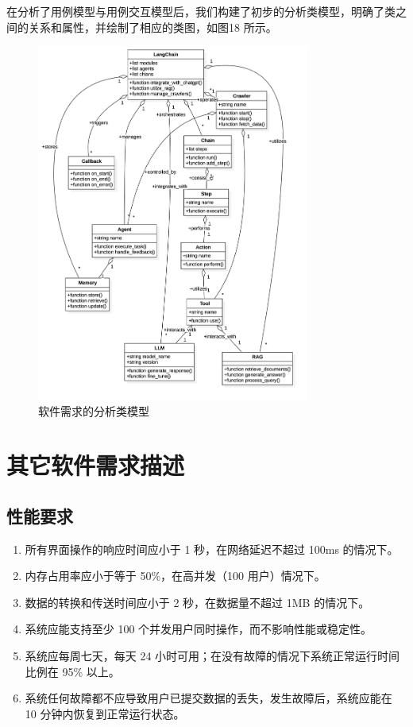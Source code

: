 \documentclass[
    report,     %
    oneside,    %
    UTF8,       %
    zihao=-4    %
]{config} %
\begin{document}
在分析了用例模型与用例交互模型后，我们构建了初步的分析类模型，明确了类之间的关系和属性，并绘制了相应的类图，如图18 所示。
\begin{figure}[H]
    \centering
    \includegraphics[width=0.8\textwidth]{UML/ClassDiagram.png}
    \caption{软件需求的分析类模型}
    \label{fig:analysis-class-model}
\end{figure}

\section{其它软件需求描述}
\subsection{性能要求}
\begin{enumerate}[label=(\arabic*)]
    \item 所有界面操作的响应时间应小于 1 秒，在网络延迟不超过 100ms 的情况下。
    \item 内存占用率应小于等于 50\%，在高并发（100 用户）情况下。
    \item 数据的转换和传送时间应小于 2 秒，在数据量不超过 1MB 的情况下。
    \item 系统应能支持至少 100 个并发用户同时操作，而不影响性能或稳定性。
    \item 系统应每周七天，每天 24 小时可用；在没有故障的情况下系统正常运行时间比例在 95\% 以上。
    \item 系统任何故障都不应导致用户已提交数据的丢失，发生故障后，系统应能在 10 分钟内恢复到正常运行状态。
\end{enumerate}
\end{document}
